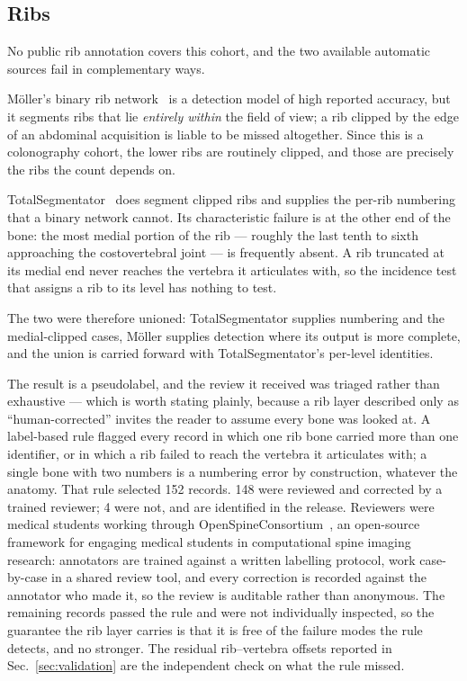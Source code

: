 \documentclass[aapm,mph,amsmath,amssymb,reprint,linenumbers]{revtex4-2}
\begin{document}
\subsection{Ribs}

No public rib annotation covers this cohort, and the two available automatic sources fail
in complementary ways.

Möller's binary rib network~\cite{moller2026} is a detection model of high reported
accuracy, but it segments ribs that lie \emph{entirely within} the field of view; a rib
clipped by the edge of an abdominal acquisition is liable to be missed altogether. Since
this is a colonography cohort, the lower ribs are routinely clipped, and those are
precisely the ribs the count depends on.

TotalSegmentator~\cite{totalsegmentator} does segment clipped ribs and supplies the
per-rib numbering that a binary network cannot. Its characteristic failure is at the other
end of the bone: the most medial portion of the rib --- roughly the last tenth to sixth
approaching the costovertebral joint --- is frequently absent. A rib truncated at its
medial end never reaches the vertebra it articulates with, so the incidence test that
assigns a rib to its level has nothing to test.

The two were therefore unioned: TotalSegmentator supplies numbering and the medial-clipped
cases, Möller supplies detection where its output is more complete, and the union is
carried forward with TotalSegmentator's per-level identities.

The result is a pseudolabel, and the review it received was triaged rather than
exhaustive --- which is worth stating plainly, because a rib layer described only as
``human-corrected'' invites the reader to assume every bone was looked at. A label-based
rule flagged every record in which one rib bone carried more than one identifier, or in
which a rib failed to reach the vertebra it articulates with; a single bone with two
numbers is a numbering error by construction, whatever the anatomy. That rule selected 152
records. 148 were reviewed and corrected by a trained reviewer; 4 were not, and are
identified in the release. Reviewers were medical students working through
OpenSpineConsortium~\cite{osc2026}, an open-source framework for engaging medical
students in computational spine imaging research: annotators are trained against a written
labelling protocol, work case-by-case in a shared review tool, and every correction is
recorded against the annotator who made it, so the review is auditable rather than
anonymous. The remaining records passed the rule and were not individually
inspected, so the guarantee the rib layer carries is that it is free of the failure modes
the rule detects, and no stronger. The residual rib--vertebra offsets reported in
Sec.~\ref{sec:validation} are the independent check on what the rule missed.
\end{document}
